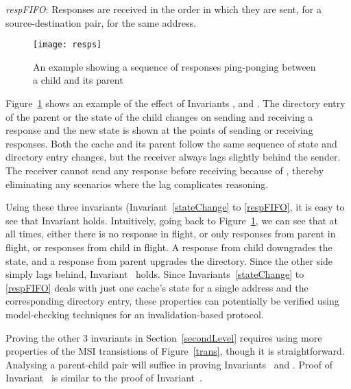 \begin{inv}
\textit{respFIFO}: Responses are received in the order in which they are sent,
for a source-destination pair, for the same address.
\label{respFIFO}
\end{inv}

\begin{figure}
\centering
\texttt{[image: resps]}
\caption{An example showing a sequence of responses ping-ponging between a child and its parent
}
\label{resps}
\end{figure}

Figure~\ref{resps} shows an example of the effect of Invariants
,  and . The directory
entry of the parent or the state of the child changes on sending and receiving
a response and the new state is shown at the points of sending or receiving
responses.
Both the cache and its parent follow the same sequence of state and directory
entry changes, but the receiver always lags slightly behind the sender.
The receiver cannot send any response before receiving because of
, thereby eliminating any scenarios where the lag complicates
reasoning.

Using these three invariants (Invariant~\ref{stateChange} to \ref{respFIFO}, it
is easy to see that Invariant  holds. Intuitively, going
back to Figure~\ref{resps}, we can see that at all times, either there is no
response in flight, or only responses from parent in flight, or responses from
child in flight. A response from child downgrades the state, and a response from
parent upgrades the directory. Since the other side simply lags behind,
Invariant~ holds. Since Invariants~\ref{stateChange} to
\ref{respFIFO} deals with just one cache's state for a single address and the
corresponding directory entry, these properties can potentially be verified
using model-checking techniques for an invalidation-based protocol.

Proving the other 3 invariants in Section~\ref{secondLevel} requires using more
properties of the MSI transistions of Figure~\ref{trans}, though it is
straightforward. Analysing a parent-child pair will suffice in proving
Invariants~ and
. Proof of Invariant~ is
similar to the proof of Invariant~.

